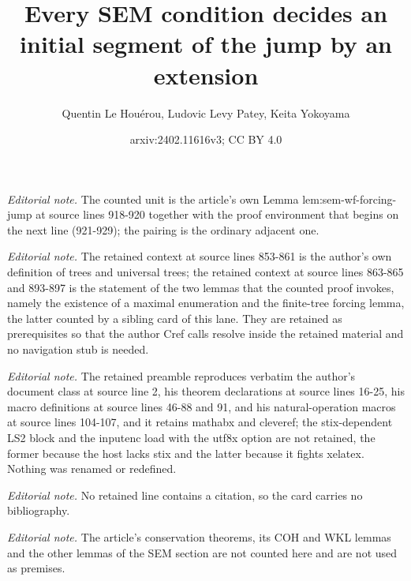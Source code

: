 \documentclass{article}
\title{Every SEM condition decides an initial segment of the jump by an extension}
\author{Quentin Le Houérou, Ludovic Levy Patey, Keita Yokoyama}
\date{arxiv:2402.11616v3; CC BY 4.0}
\numberwithin{theorem}{section}
\begin{document}
\maketitle
\noindent\textit{Editorial note.} The counted unit is the article's own Lemma lem:sem-wf-forcing-jump at source lines 918-920 together with the proof environment that begins on the next line (921-929); the pairing is the ordinary adjacent one.\par\medskip
\noindent\textit{Editorial note.} The retained context at source lines 853-861 is the author's own definition of trees and universal trees; the retained context at source lines 863-865 and 893-897 is the statement of the two lemmas that the counted proof invokes, namely the existence of a maximal enumeration and the finite-tree forcing lemma, the latter counted by a sibling card of this lane. They are retained as prerequisites so that the author Cref calls resolve inside the retained material and no navigation stub is needed.\par\medskip
\noindent\textit{Editorial note.} The retained preamble reproduces verbatim the author's document class at source line 2, his theorem declarations at source lines 16-25, his macro definitions at source lines 46-88 and 91, and his natural-operation macros at source lines 104-107, and it retains mathabx and cleveref; the stix-dependent LS2 block and the inputenc load with the utf8x option are not retained, the former because the host lacks stix and the latter because it fights xelatex. Nothing was renamed or redefined.\par\medskip
\noindent\textit{Editorial note.} No retained line contains a citation, so the card carries no bibliography.\par\medskip
\noindent\textit{Editorial note.} The article's conservation theorems, its COH and WKL lemmas and the other lemmas of the SEM section are not counted here and are not used as premises.\par\medskip
\end{document}
